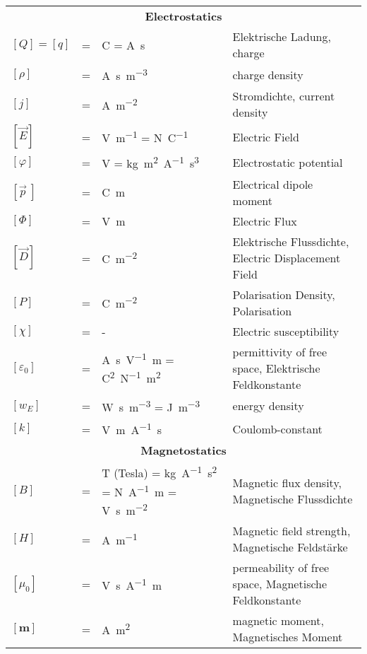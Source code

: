 {\begin{tabularx}{\linewidth}{lclX}
		\multicolumn{4}{c}{\textbf{Electrostatics}}\\
		$[Q]=[q]$ &=& \si{\coulomb} = \si{\ampere\second} & Elektrische Ladung, charge \\
		$[\rho]$ &=& \si{\ampere\second\per\meter\cubed} & charge density\\
		$[j]$ &=& \si{\ampere\per\square\meter} & Stromdichte, current density \\	
		$[\vec{E}]$ &=& \si{\volt\per\meter} = \si{\newton\per\coulomb} & Electric Field \\
		$[\varphi]$ &=& \si{\volt} = \si{\kilogram\meter\squared\per\ampere\second\cubed} & Electrostatic potential \\
		$[\vec{p}\:]$ &=& \si{\coulomb\meter} & Electrical dipole moment \\
		$[\Phi]$ &=& \si{\volt\meter} & Electric Flux\\
		$[\vec{D}]$ &=& \si{\coulomb\per\square\meter} & Elektrische Flussdichte, Electric Displacement Field\\
		$[P]$ &=& \si{\coulomb\per\square\meter} & Polarisation Density, Polarisation \\
		$[\chi]$&=& - &Electric susceptibility\\
		$[\varepsilon_0]$ &=& \si{\ampere\second\per\volt\meter} = \si{\square\coulomb\per\newton\square\meter} & permittivity of free space, Elektrische Feldkonstante \\

		$[w_E]$ &=& \si{\watt\second\per\meter\cubed} = \si{\joule\per\meter\cubed} & energy density\\
		$[k]$ &=& \si{\volt\meter\per\ampere\second} & Coulomb-constant \\				
		\multicolumn{4}{c}{\textbf{Magnetostatics}}\\
	
		$[B]$ &=& \si{\tesla} (Tesla) = \si{\kilogram\per\ampere\square\second} = \si{\newton\per\ampere\meter} = \si{\volt\second\per\square\meter} & Magnetic flux density, Magnetische Flussdichte \\
		$[H]$ &=& \si{\ampere\per\meter} & Magnetic field strength, Magnetische Feldstärke \\
		

		$[\mu_0]$ &=& \si{\volt\second\per\ampere\meter} & permeability of free space, Magnetische Feldkonstante \\
		$[\bm m]$ &=& \si{\ampere\meter\squared} & magnetic moment, Magnetisches Moment\\
	\end{tabularx}

}
